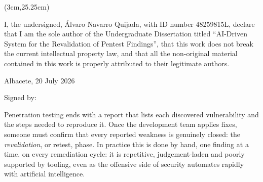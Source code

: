 \begin{textblock*}{\textwidth}(3cm,25.25cm)
\begin{flushright}
{\fontsize{14pt}{4pt}\selectfont \fecha}
\end{flushright}
\end{textblock*}


\cleardoublepage
\thispagestyle{plain}
\begin{center}
\Large{}
\end{center}
\vskip1cm

I, the undersigned, Álvaro Navarro Quijada, with ID number 48259815L, declare that I am the sole author of the Undergraduate Dissertation titled ``AI-Driven System for the Revalidation of Pentest Findings'', that this work does not break the current intellectual property law, and that all the non-original material contained in this work is properly attributed to their legitimate authors.

\vspace*{2cm}
\begin{center}
Albacete, 20 July 2026

\vskip3cm

Signed by: \autor
\end{center}


\cleardoublepage
\thispagestyle{plain}
\begin{center}
\Large{}
\end{center}
\vskip1cm

Penetration testing ends with a report that lists each discovered vulnerability and
the steps needed to reproduce it. Once the development team applies fixes, someone
must confirm that every reported weakness is genuinely closed: the
\emph{revalidation}, or retest, phase. In practice this is done by hand, one finding
at a time, on every remediation cycle: it is repetitive, judgement-laden and poorly
supported by tooling, even as the offensive side of security automates rapidly with
artificial intelligence.

